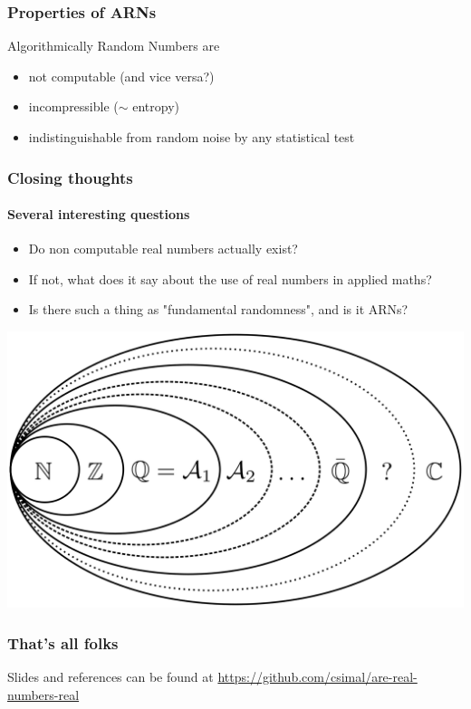 \documentclass{beamer}
\begin{document}
\begin{frame}
    \frametitle{Properties of ARNs}
    Algorithmically Random Numbers are
    \begin{itemize}
        \item not computable (and vice versa?)
        \item incompressible ($\sim$ entropy)
        \item indistinguishable from random noise by any statistical test
    \end{itemize}
    
\end{frame}

\begin{frame}
    \frametitle{Closing thoughts}
    \framesubtitle{Several interesting questions}
    \begin{itemize}
        \item Do non computable real numbers actually exist?
        \item If not, what does it say about the use of real numbers in applied maths?
        \item Is there such a thing as "fundamental randomness", and is it ARNs?
    \end{itemize}
\end{frame}

\begin{frame}
    \begin{center}
        \includegraphics[width=.8\textwidth]{images/numbers.png}
    \end{center}
\end{frame}

\begin{frame}
    \frametitle{That's all folks}
    Slides and references can be found at
    \url{https://github.com/csimal/are-real-numbers-real}
\end{frame}
\end{document}

